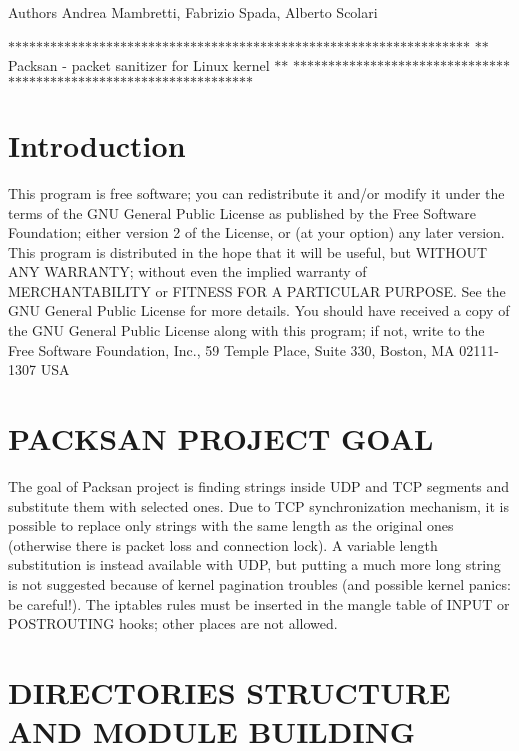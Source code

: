 \begin{DoxyAuthor}{Authors}
Andrea Mambretti, Fabrizio Spada, Alberto Scolari
\end{DoxyAuthor}
$\ast$$\ast$$\ast$$\ast$$\ast$$\ast$$\ast$$\ast$$\ast$$\ast$$\ast$$\ast$$\ast$$\ast$$\ast$$\ast$$\ast$$\ast$$\ast$$\ast$$\ast$$\ast$$\ast$$\ast$$\ast$$\ast$$\ast$$\ast$$\ast$$\ast$$\ast$$\ast$$\ast$$\ast$$\ast$$\ast$$\ast$$\ast$$\ast$$\ast$$\ast$$\ast$$\ast$$\ast$$\ast$$\ast$$\ast$$\ast$$\ast$$\ast$$\ast$$\ast$$\ast$$\ast$$\ast$$\ast$$\ast$$\ast$$\ast$$\ast$$\ast$$\ast$$\ast$$\ast$$\ast$$\ast$ $\ast$$\ast$ Packsan -\/ packet sanitizer for Linux kernel $\ast$$\ast$ $\ast$$\ast$$\ast$$\ast$$\ast$$\ast$$\ast$$\ast$$\ast$$\ast$$\ast$$\ast$$\ast$$\ast$$\ast$$\ast$$\ast$$\ast$$\ast$$\ast$$\ast$$\ast$$\ast$$\ast$$\ast$$\ast$$\ast$$\ast$$\ast$$\ast$$\ast$$\ast$$\ast$$\ast$$\ast$$\ast$$\ast$$\ast$$\ast$$\ast$$\ast$$\ast$$\ast$$\ast$$\ast$$\ast$$\ast$$\ast$$\ast$$\ast$$\ast$$\ast$$\ast$$\ast$$\ast$$\ast$$\ast$$\ast$$\ast$$\ast$$\ast$$\ast$$\ast$$\ast$$\ast$$\ast$ \hypertarget{index_intro}{}\section{Introduction}\label{index_intro}
This program is free software; you can redistribute it and/or modify it under the terms of the GNU General Public License as published by the Free Software Foundation; either version 2 of the License, or (at your option) any later version. This program is distributed in the hope that it will be useful, but WITHOUT ANY WARRANTY; without even the implied warranty of MERCHANTABILITY or FITNESS FOR A PARTICULAR PURPOSE. See the GNU General Public License for more details. You should have received a copy of the GNU General Public License along with this program; if not, write to the Free Software Foundation, Inc., 59 Temple Place, Suite 330, Boston, MA 02111-\/1307 USA\hypertarget{index_goal}{}\section{PACKSAN PROJECT GOAL}\label{index_goal}
The goal of Packsan project is finding strings inside UDP and TCP segments and substitute them with selected ones. Due to TCP synchronization mechanism, it is possible to replace only strings with the same length as the original ones (otherwise there is packet loss and connection lock). A variable length substitution is instead available with UDP, but putting a much more long string is not suggested because of kernel pagination troubles (and possible kernel panics: be careful!). The iptables rules must be inserted in the mangle table of INPUT or POSTROUTING hooks; other places are not allowed.\hypertarget{index_dirs_build}{}\section{DIRECTORIES STRUCTURE AND MODULE BUILDING}\label{index_dirs_build}
